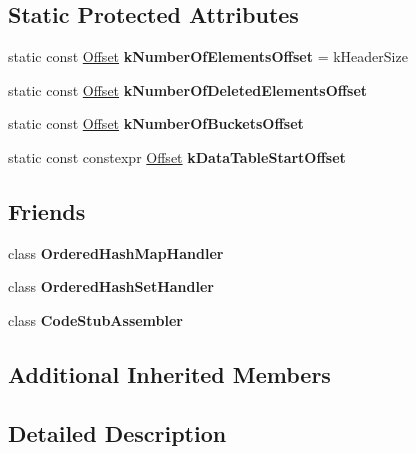 \subsection*{Static Protected Attributes}
\begin{DoxyCompactItemize}
\item 
\mbox{\label{classv8_1_1internal_1_1SmallOrderedHashTable_a9e299848e38db61618996bd59d503c24}} 
static const \mbox{\hyperlink{classint}{Offset}} {\bfseries k\+Number\+Of\+Elements\+Offset} = k\+Header\+Size
\item 
static const \mbox{\hyperlink{classint}{Offset}} {\bfseries k\+Number\+Of\+Deleted\+Elements\+Offset}
\item 
static const \mbox{\hyperlink{classint}{Offset}} {\bfseries k\+Number\+Of\+Buckets\+Offset}
\item 
static const constexpr \mbox{\hyperlink{classint}{Offset}} {\bfseries k\+Data\+Table\+Start\+Offset}
\end{DoxyCompactItemize}
\subsection*{Friends}
\begin{DoxyCompactItemize}
\item 
\mbox{\label{classv8_1_1internal_1_1SmallOrderedHashTable_a874717d2700f5cb3733ed210298e478b}} 
class {\bfseries Ordered\+Hash\+Map\+Handler}
\item 
\mbox{\label{classv8_1_1internal_1_1SmallOrderedHashTable_a08d359103ef81c342ab82dfe29263546}} 
class {\bfseries Ordered\+Hash\+Set\+Handler}
\item 
\mbox{\label{classv8_1_1internal_1_1SmallOrderedHashTable_ab0fdd46d6a0fd9cdf4ce8df83e1efadd}} 
class {\bfseries Code\+Stub\+Assembler}
\end{DoxyCompactItemize}
\subsection*{Additional Inherited Members}


\subsection{Detailed Description}
